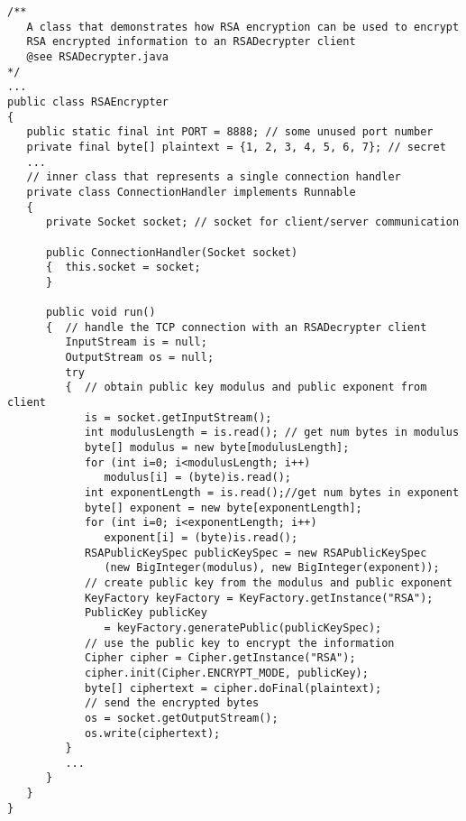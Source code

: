 \begin{figure*}\begin{program}\begin{verbatim}
/**
   A class that demonstrates how RSA encryption can be used to encrypt
   RSA encrypted information to an RSADecrypter client
   @see RSADecrypter.java
*/
...
public class RSAEncrypter
{
   public static final int PORT = 8888; // some unused port number
   private final byte[] plaintext = {1, 2, 3, 4, 5, 6, 7}; // secret
   ...
   // inner class that represents a single connection handler
   private class ConnectionHandler implements Runnable
   {
      private Socket socket; // socket for client/server communication

      public ConnectionHandler(Socket socket)
      {  this.socket = socket;
      }

      public void run()
      {  // handle the TCP connection with an RSADecrypter client
         InputStream is = null;
         OutputStream os = null;
         try
         {  // obtain public key modulus and public exponent from client
            is = socket.getInputStream();
            int modulusLength = is.read(); // get num bytes in modulus
            byte[] modulus = new byte[modulusLength];
            for (int i=0; i<modulusLength; i++)
               modulus[i] = (byte)is.read();
            int exponentLength = is.read();//get num bytes in exponent
            byte[] exponent = new byte[exponentLength];
            for (int i=0; i<exponentLength; i++)
               exponent[i] = (byte)is.read();
            RSAPublicKeySpec publicKeySpec = new RSAPublicKeySpec
               (new BigInteger(modulus), new BigInteger(exponent));
            // create public key from the modulus and public exponent
            KeyFactory keyFactory = KeyFactory.getInstance("RSA");
            PublicKey publicKey
               = keyFactory.generatePublic(publicKeySpec);
            // use the public key to encrypt the information
            Cipher cipher = Cipher.getInstance("RSA");
            cipher.init(Cipher.ENCRYPT_MODE, publicKey);
            byte[] ciphertext = cipher.doFinal(plaintext);
            // send the encrypted bytes
            os = socket.getOutputStream();
            os.write(ciphertext);
         }
         ...
      }
   }
}
\end{verbatim}\end{program}\end{figure*}
